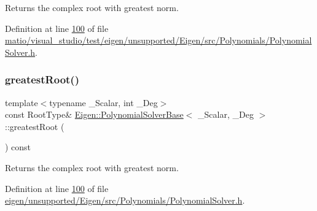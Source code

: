 \begin{DoxyReturn}{Returns}
the complex root with greatest norm. 
\end{DoxyReturn}


Definition at line \hyperlink{matio_2visual__studio_2test_2eigen_2unsupported_2_eigen_2src_2_polynomials_2_polynomial_solver_8h_source_l00100}{100} of file \hyperlink{matio_2visual__studio_2test_2eigen_2unsupported_2_eigen_2src_2_polynomials_2_polynomial_solver_8h_source}{matio/visual\+\_\+studio/test/eigen/unsupported/\+Eigen/src/\+Polynomials/\+Polynomial\+Solver.\+h}.

\mbox{\label{class_eigen_1_1_polynomial_solver_base_a0327769cc88877a79c7c838f03d78384}} 
\subsubsection{\texorpdfstring{greatest\+Root()}{greatestRoot()}\hspace{0.1cm}{\footnotesize\ttfamily [2/2]}}
{\footnotesize\ttfamily template$<$typename \+\_\+\+Scalar, int \+\_\+\+Deg$>$ \\
const Root\+Type\& \hyperlink{class_eigen_1_1_polynomial_solver_base}{Eigen\+::\+Polynomial\+Solver\+Base}$<$ \+\_\+\+Scalar, \+\_\+\+Deg $>$\+::greatest\+Root (\begin{DoxyParamCaption}{ }\end{DoxyParamCaption}) const\hspace{0.3cm}{\ttfamily [inline]}}

\begin{DoxyReturn}{Returns}
the complex root with greatest norm. 
\end{DoxyReturn}


Definition at line \hyperlink{eigen_2unsupported_2_eigen_2src_2_polynomials_2_polynomial_solver_8h_source_l00100}{100} of file \hyperlink{eigen_2unsupported_2_eigen_2src_2_polynomials_2_polynomial_solver_8h_source}{eigen/unsupported/\+Eigen/src/\+Polynomials/\+Polynomial\+Solver.\+h}.

\mbox{\label{class_eigen_1_1_polynomial_solver_base_a4ea3b29499623832a0ad7b2b3ab05597}} 
